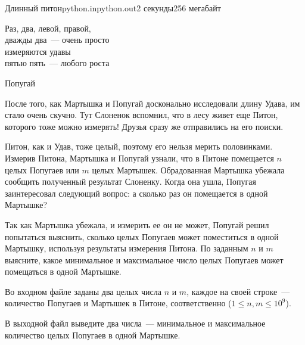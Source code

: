\begin{problem}{Длинный питон}{python.in}{python.out}{2 секунды}{256 мегабайт}


\epigraph{Раз, два, левой, правой,\\
дважды два~--- очень просто\\
измеряются удавы\\
пятью пять~--- любого роста}{Попугай}

После того, как Мартышка и Попугай досконально исследовали длину Удава, им 
стало очень скучно. Тут Слоненок вспомнил, что в лесу живет еще
Питон, которого тоже можно измерять! Друзья сразу же отправились на его поиски.

Питон, как и Удав, тоже целый, поэтому его нельзя мерить половинками.
Измерив Питона, Мартышка и Попугай узнали, что в Питоне помещается 
$n$ целых Попугаев или $m$ целых Мартышек. Обрадованная Мартышка убежала 
сообщить полученный результат Слоненку.
Когда она ушла, Попугая заинтересовал следующий вопрос:
а сколько раз он помещается в одной Мартышке?

Так как Мартышка убежала, и измерить ее он не может, Попугай решил попытаться выяснить, 
сколько целых Попугаев может поместиться в одной Мартышку, используя результаты
измерения Питона. По заданным $n$ и $m$ выясните, какое минимальное
и максимальное число целых Попугаев может помещаться в одной Мартышке.

\InputFile

Во входном файле заданы два целых числа $n$ и $m$, каждое на своей строке~--- количество
Попугаев и Мартышек в Питоне, соответственно ($1 \le n, m \le 10^9$).

\OutputFile
В выходной файл выведите два числа~--- минимальное и максимальное количество
целых Попугаев в одной Мартышке.

\Example

\begin{example}%
%
\end{example}

\end{problem}
